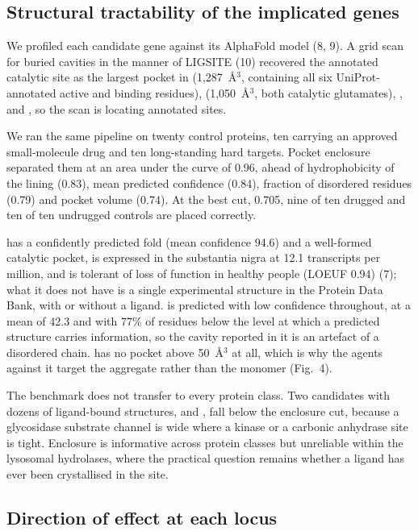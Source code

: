 \documentclass[10pt]{article}
\begin{document}
\subsection*{Structural tractability of the implicated genes}

We profiled each candidate gene against its AlphaFold model (8, 9). A grid scan for buried cavities in the manner of LIGSITE (10) recovered the
annotated catalytic site as the largest pocket in  (1,287~\AA$^3$, containing all six
UniProt-annotated active and binding residues),  (1,050~\AA$^3$, both catalytic
glutamates), ,  and , so the scan is locating annotated sites.

We ran the same pipeline on twenty control proteins, ten carrying an approved small-molecule drug and ten long-standing hard targets. Pocket
enclosure separated them at an area under the curve of 0.96, ahead of hydrophobicity of the lining
(0.83), mean predicted confidence (0.84), fraction of disordered residues (0.79) and pocket volume
(0.74). At the best cut, 0.705, nine of ten drugged and ten of ten undrugged controls are placed
correctly.

 has a confidently predicted fold (mean confidence 94.6) and a well-formed catalytic pocket, is expressed in the
substantia nigra at 12.1 transcripts per million, and is tolerant of loss of function in healthy people (LOEUF 0.94) (7); what it does not have is a single experimental structure in the Protein Data
Bank, with or without a ligand.  is predicted with low confidence throughout, at a mean of 42.3 and with 77\% of residues below the level at which a predicted structure carries information, so the cavity reported in it is an artefact of a disordered chain.  has no pocket above 50~\AA$^3$ at all, which is why the agents
against it target the aggregate rather than the monomer (Fig.~4).

The benchmark does not transfer to every protein class. Two candidates with dozens of ligand-bound structures, 
and , fall below the enclosure cut, because a glycosidase substrate channel is wide
where a kinase or a carbonic anhydrase site is tight. Enclosure is informative across protein classes but unreliable within the lysosomal hydrolases, where the practical question remains whether a ligand has ever been crystallised in the site.

\subsection*{Direction of effect at each locus}
\end{document}
